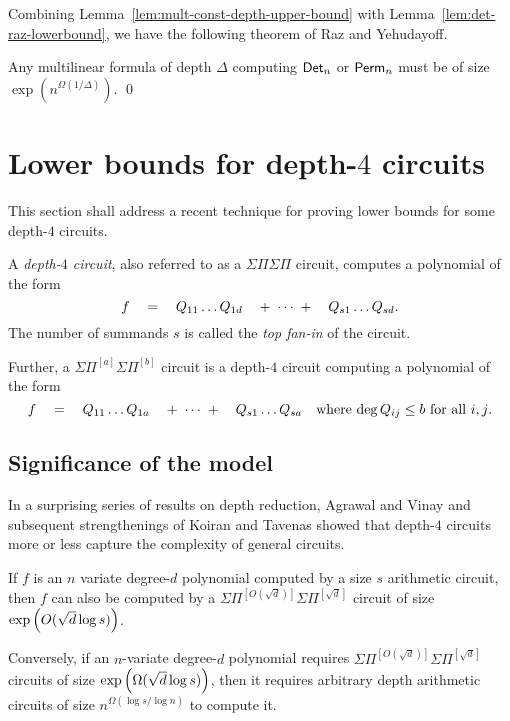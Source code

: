 \documentclass[12pt]{report}
\newcommand{\SPSP}{\Sigma\Pi\Sigma\Pi}
\newcommand{\mySPSP}[2]{\Sigma\Pi^{[#1]}\Sigma\Pi^{[#2]}}
\begin{document}
Combining Lemma~\ref{lem:mult-const-depth-upper-bound} with Lemma~\ref{lem:det-raz-lowerbound}, we have the following theorem of Raz and Yehudayoff. 

\begin{theorem}
Any multilinear formula of depth $\Delta$ computing $\mathsf{Det}_n$ or $\mathsf{Perm}_n$ must be of size $\exp(n^{\Omega(1/\Delta)})$.  \qed
\end{theorem}

\chapter{Lower bounds for depth-$4$ circuits}

This section shall address a recent technique for proving lower bounds for some depth-$4$ circuits. 

\begin{definition}
  A \emph{depth-$4$ circuit}, also referred to as a $\SPSP$ circuit, computes a polynomial of the form 
  $$
  f \quad = \quad Q_{11}\dots Q_{1d} \quad +\;\cdots\;+ \quad  Q_{s1}\dots Q_{sd}.
  $$
  The number of summands $s$ is called the \emph{top fan-in} of the circuit. 

  Further, a $\mySPSP{a}{b}$ circuit is a depth-$4$ circuit computing a polynomial of the form
  $$
  f \quad = \quad Q_{11}\dots Q_{1a} \quad +\;\cdots\;+ \quad  Q_{s1}\dots Q_{sa}\quad\text{where $\deg Q_{ij} \leq b$ for all $i,j$}.
  $$
\end{definition}

\section{Significance of the model}

In a surprising series of results on depth reduction, Agrawal and Vinay \cite{av08} and subsequent strengthenings of Koiran \cite{koiran} and Tavenas \cite{Tav13} showed that depth-$4$ circuits more or less capture the complexity of general circuits. 

\begin{theorem} 
  If $f$ is an $n$ variate degree-$d$ polynomial computed by a size $s$ arithmetic circuit, then $f$ can also be computed by a $\mySPSP{O(\sqrt{d})}{\sqrt{d}}$ circuit of size $\exp\left(O(\sqrt{d}\log s)\right)$. 
  
  Conversely, if an $n$-variate degree-$d$ polynomial requires $\mySPSP{O(\sqrt{d})}{\sqrt{d}}$  circuits of size $\exp\left(\Omega(\sqrt{d}\log s)\right)$, then it requires arbitrary depth arithmetic circuits of size $n^{\Omega(\log s / \log n)}$ to compute it. 
\end{theorem}
\end{document}
